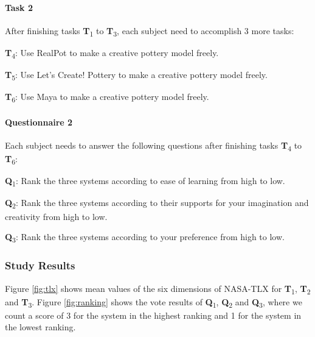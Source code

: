 \paragraph{Task 2} After finishing tasks \textbf{T}\textsubscript{1} to \textbf{T}\textsubscript{3}, each subject need to accomplish 3 more tasks:

\textbf{T}\textsubscript{4}: Use RealPot to make a creative pottery model freely.

\textbf{T}\textsubscript{5}: Use Let's Create! Pottery to make a creative pottery model freely.

\textbf{T}\textsubscript{6}: Use Maya to make a creative pottery model freely.

\paragraph{Questionnaire 2} Each subject needs to answer the following questions after finishing tasks \textbf{T}\textsubscript{4} to \textbf{T}\textsubscript{6}:

\textbf{Q}\textsubscript{1}: Rank the three systems according to ease of learning from high to low.

\textbf{Q}\textsubscript{2}: Rank the three systems according to their supports for your imagination and creativity from high to low.

\textbf{Q}\textsubscript{3}: Rank the three systems according to your preference from high to low.


\subsubsection{Study Results}


Figure \ref{fig:tlx} shows mean values of the six dimensions of NASA-TLX for \textbf{T}\textsubscript{1}, \textbf{T}\textsubscript{2} and \textbf{T}\textsubscript{3}.
Figure \ref{fig:ranking} shows the vote results of \textbf{Q}\textsubscript{1}, \textbf{Q}\textsubscript{2} and \textbf{Q}\textsubscript{3}, where we count a score of 3 for the system in the highest ranking and 1 for the system in the lowest ranking. 

